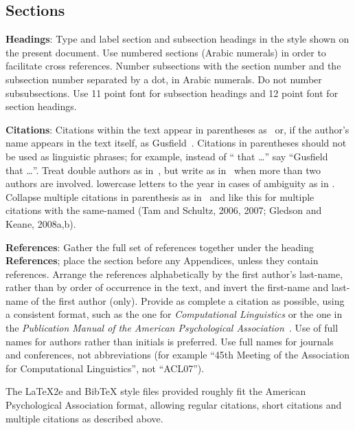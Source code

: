 \documentclass[11pt]{article}
\begin{document}
\subsection{Sections}

{\bf Headings}: Type and label section and subsection headings in the
style shown on the present document.  Use numbered sections (Arabic
numerals) in order to facilitate cross references. Number subsections
with the section number and the subsection number separated by a dot,
in Arabic numerals. Do not number subsubsections. Use 11 point font for
subsection headings and 12 point font for section headings.

{\bf Citations}: Citations within the text appear in parentheses
as~\cite{Gusfield:97} or, if the author's name appears in the text itself, as
Gusfield~. Citations in parentheses should not be used
as linguistic phrases; for example, instead of ``\cite{Gusfield:97} 
that \ldots'' say ``Gusfield~  that \ldots''.
Treat double authors as in~\cite{Aho:72}, but write as in~\cite{Chandra:81} when more than
two authors are involved. 
 lowercase letters to the year in cases of ambiguity as in \cite{Gledson:08homog}. 
Collapse multiple citations in parenthesis as
in~\cite{Gusfield:97,Aho:72} and like this for multiple citations with the same-named 
(Tam and Schultz, 2006, 2007; Gledson and Keane, 2008a,b).

\textbf{References}: Gather the full set of references together under the
heading {\bf References}; place the section before any Appendices, unless they
contain references. Arrange the references alphabetically by the first
author's last-name, rather than by order of occurrence in the text, and invert
the first-name and last-name of the first author (only). Provide as complete
a citation as possible, using a consistent format, such as the one for {\em
Computational Linguistics\/} or the one in the {\em Publication Manual of the
American Psychological Association\/}~\cite{APA:83}.  Use of full names for
authors rather than initials is preferred.  Use full names for journals and
conferences, not abbreviations (for example ``45th Meeting of the Association
for Computational Linguistics'', not ``ACL07'').

The \LaTeX2e{} and Bib\TeX{} style files provided roughly fit the
American Psychological Association format, allowing regular citations,
short citations and multiple citations as described above.
\end{document}
